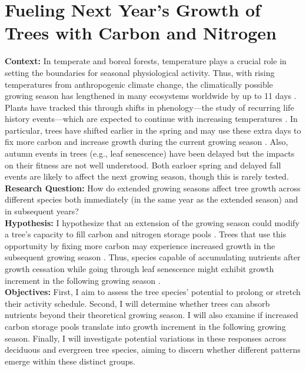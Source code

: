 \documentclass{article}
\begin{document}
\section*{Fueling Next Year's Growth of Trees with Carbon and Nitrogen}
\textbf {Context:}
In temperate and boreal forests, temperature plays a crucial role in setting the boundaries for seasonal physiological activity. Thus, with rising temperatures from anthropogenic climate change, the climatically possible growing season has lengthened in many ecosystems worldwide by up to 11 days \citep{korner_phenology_2010, menzel_growing_1999}. Plants have tracked this through shifts in phenology—the study of recurring life history events—which are expected to continue with increasing temperatures \citep{wolkovich_warming_2012}. In particular, trees have shifted earlier in the spring and may use these extra days to fix more carbon and increase growth during the current growing season \citep{keenan_net_2014, wang_interactive_2020}. Also, autumn events in trees (e.g., leaf senescence) have been delayed but the impacts on their fitness are not well understood. Both earloer spring and delayed fall events are likely to affect the next growing season, though this is rarely tested. \\
\textbf {Research Question:} How do extended growing seasons affect tree growth across different species both immediately (in the same year as the extended season) and in subsequent years? \\
\textbf {Hypothesis:} I hypothesize that an extension of the growing season could modify a tree’s capacity to fill carbon and nitrogen storage pools \citep{chapin_ecology_1990, lawrence_variable_2018}. Trees that use this opportunity by fixing more carbon may experience increased growth in the subsequent growing season \citep{landhausser_partitioning_2012, martens_first-year_2007}. Thus, species capable of accumulating nutrients after growth cessation while going through leaf senescence might exhibit growth increment in the following growing season \citep{schott_premature_2013}. \\
\textbf {Objectives:} First, I aim to assess the tree species' potential to prolong or stretch their activity schedule. Second, I will determine whether trees can absorb nutrients beyond their theoretical growing season. I will also examine if increased carbon storage pools translate into growth increment in the following growing season. Finally, I will investigate potential variations in these responses across deciduous and evergreen tree species, aiming to discern whether different patterns emerge within these distinct groups.\\
\end{document}
